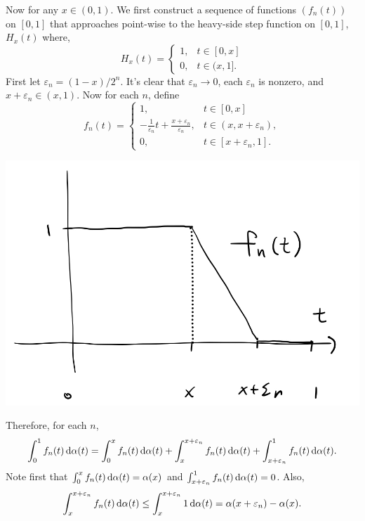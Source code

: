 \documentclass[12pt]{article}
\begin{document}
\begin{fproof}[3(b)]
Now for any \(x \in (0,1)\).
We first construct a sequence of functions \((f_n(t))\) on \([0,1]\) that approaches point-wise to the heavy-side step function on \([0,1]\), \(H_x(t)\) where,
\[
H_x(t) = 
\begin{cases}
    1, & t \in [0,x]\\
    0, & t \in (x,1].
\end{cases}
\]
First let \(\varepsilon_n = (1-x)/2^n\).
It's clear that \(\varepsilon_n \to 0\), each \(\varepsilon_n\) is nonzero,  and \(x + \varepsilon_n \in (x,1)\).
Now for each \(n\), define 
\[
f_n(t) = 
\begin{cases}
    1, & t \in [0,x]\\
    -\frac{1}{\varepsilon_n} t + \frac{x + \varepsilon_n}{\varepsilon_n}, & t \in (x, x + \varepsilon_n),\\
    0, & t\in [x + \varepsilon_n, 1].
\end{cases}
\]
\begin{center}
    \includegraphics[scale=0.2]{Asst6.3b.jpeg}
\end{center}
Therefore, for each \(n\),
\begin{align*}
    \int_{0}^{1}f_n(t) \mathop{}\!\mathrm{d}\alpha(t) = \int_{0}^{x} f_n(t) \mathop{}\!\mathrm{d}\alpha(t) + \int_{x}^{x+\varepsilon_n} f_n(t) \mathop{}\!\mathrm{d}\alpha(t) + \int_{x+\varepsilon_n}^{1} f_n(t) \mathop{}\!\mathrm{d}\alpha(t).
\end{align*}
Note first that \(\int_{0}^{x} f_n(t) \mathop{}\!\mathrm{d}\alpha(t) = \alpha(x)\) and \(\int_{x+\varepsilon_n}^{1} f_n(t) \mathop{}\!\mathrm{d}\alpha(t) = 0\).
Also,
\begin{align*}
    \int_{x}^{x+\varepsilon_n} f_n(t) \mathop{}\!\mathrm{d}\alpha(t) \leq \int_{x}^{x+\varepsilon_n} 1 \mathop{}\!\mathrm{d}\alpha(t) = \alpha(x + \varepsilon_n) - \alpha(x).
\end{align*}

\end{fproof}
\end{document}
